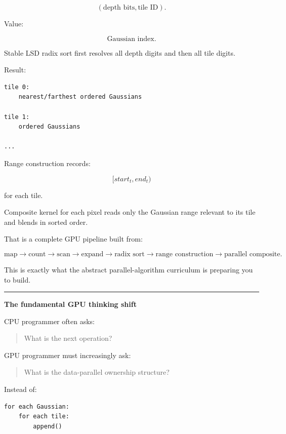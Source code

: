 \[
(\text{depth bits},\text{tile ID}).
\]

Value:

\[
\text{Gaussian index}.
\]

Stable LSD radix sort first resolves all depth digits and then all tile digits.

Result:

\protect{}\label{387b66}%
\begin{verbatim}
tile 0:
    nearest/farthest ordered Gaussians

tile 1:
    ordered Gaussians

...
\end{verbatim}

Range construction records:

\[
[start_t,end_t)
\]

for each tile.

Composite kernel for each pixel reads only the Gaussian range relevant to its tile and blends in sorted order.

That is a complete GPU pipeline built from:

\[
\boxed{
\text{map}
\rightarrow
\text{count}
\rightarrow
\text{scan}
\rightarrow
\text{expand}
\rightarrow
\text{radix sort}
\rightarrow
\text{range construction}
\rightarrow
\text{parallel composite}.
}
\]

This is exactly what the abstract parallel-algorithm curriculum is preparing you to build.

\begin{center}\rule{0.5\linewidth}{0.5pt}\end{center}

\textbf{The fundamental GPU thinking shift}

CPU programmer often asks:

\begin{quote}
What is the next operation?
\end{quote}

GPU programmer must increasingly ask:

\begin{quote}
What is the data-parallel ownership structure?
\end{quote}

Instead of:

\protect{}\label{yllozt}%
\begin{verbatim}
for each Gaussian:
    for each tile:
        append()
\end{verbatim}

